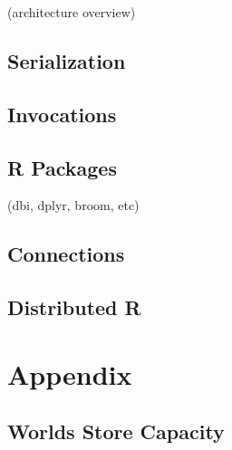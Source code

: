 \documentclass[]{book}
\theoremstyle{definition}
\theoremstyle{definition}
\theoremstyle{definition}
\theoremstyle{remark}
\begin{document}
(architecture overview)

\hypertarget{serialization}{%
\section{Serialization}\label{serialization}}

\hypertarget{invocations}{%
\section{Invocations}\label{invocations}}

\hypertarget{r-packages}{%
\section{R Packages}\label{r-packages}}

(dbi, dplyr, broom, etc)

\hypertarget{connections-1}{%
\section{Connections}\label{connections-1}}

\hypertarget{distributed-r}{%
\section{Distributed R}\label{distributed-r}}

\hypertarget{appendix}{%
\chapter*{Appendix}\label{appendix}}

\hypertarget{storage-capacity}{%
\section{Worlds Store Capacity}\label{storage-capacity}}
\end{document}
